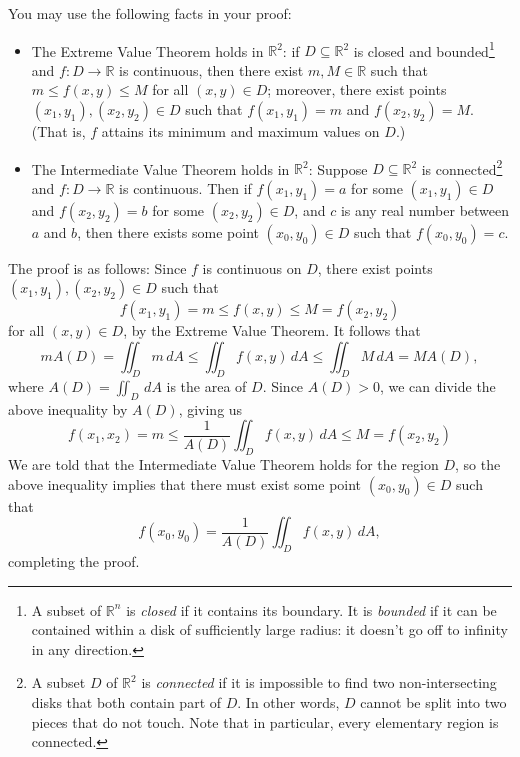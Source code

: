\documentclass[letterpaper,12pt]{article}
\newcommand{\R}{\mathbb{R}}
\begin{document}
\begin{enumerate}
You may use the following facts in your proof:
\begin{itemize}
 \item The Extreme Value Theorem holds in $\R^2$: if $D\subseteq \R^2$ is closed and bounded\footnote{A subset of $\R^n$ is {\em closed} if it contains its boundary. It is {\em bounded} if it can be contained within a disk of sufficiently large radius: it doesn't go off to infinity in any direction.} and $f:D\to\R$ is continuous, then there exist $m,M\in\R$ such that $m\leq f(x,y)\leq M$ for all $(x,y)\in D$; moreover, there exist points $(x_1,y_1), (x_2,y_2)\in D$ such that $f(x_1,y_1)=m$ and $f(x_2,y_2)=M$. (That is, $f$ attains its minimum and maximum values on $D$.)

 \item The Intermediate Value Theorem holds in $\R^2$: Suppose $D\subseteq \R^2$ is connected\footnote{A subset $D$ of $\R^2$ is {\em connected} if it is impossible to find two non-intersecting disks that both contain part of $D$. In other words, $D$ cannot be split into two pieces that do not touch. Note that in particular, every elementary region is connected.} and $f:D\to \R$ is continuous. Then if $f(x_1,y_1)=a$ for some $(x_1,y_1)\in D$ and $f(x_2,y_2)=b$ for some $(x_2,y_2)\in D$, and $c$ is any real number between $a$ and $b$, then there exists some point $(x_0,y_0)\in D$ such that $f(x_0,y_0)=c$.
\end{itemize}

\bigskip

The proof is as follows: Since $f$ is continuous on $D$, there exist points $(x_1,y_1), (x_2,y_2)\in D$ such that
\[
 f(x_1,y_1)=m\leq f(x,y)\leq M=f(x_2,y_2)
\]
for all $(x,y)\in D$, by the Extreme Value Theorem. It follows that
\[
 mA(D) = \iint_D m \,dA \leq \iint_D f(x,y)\,dA \leq \iint_D M\,dA = MA(D),
\]
where $A(D) =\iint_D\,dA$ is the area of $D$. Since $A(D)>0$, we can divide the above inequality by $A(D)$, giving us
\[
 f(x_1,x_2) = m\leq \frac{1}{A(D)}\iint_D f(x,y)\,dA \leq M = f(x_2,y_2)
\]
We are told that the Intermediate Value Theorem holds for the region $D$, so the above inequality implies that there must exist some point $(x_0,y_0)\in D$ such that
\[
 f(x_0,y_0) = \frac{1}{A(D)}\iint_D f(x,y)\,dA,
\]
completing the proof.



\end{enumerate}
\end{document}
